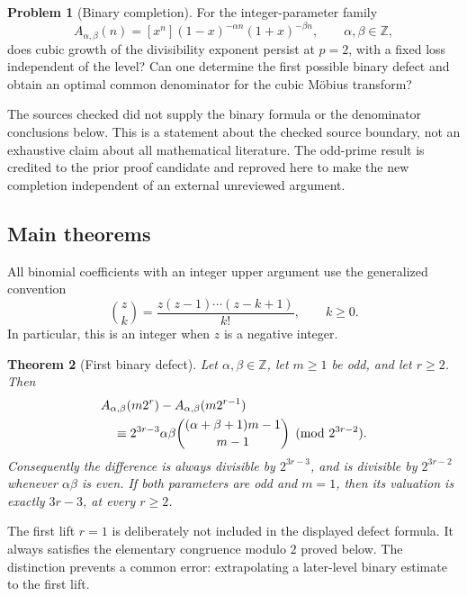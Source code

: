 \documentclass[11pt,a4paper]{article}
\numberwithin{equation}{section}
\newtheorem{theorem}{Theorem}[section]
\theoremstyle{definition}
\newtheorem{problem}[theorem]{Problem}
\theoremstyle{remark}
\newcommand{\Z}{\mathbb Z}
\newcommand{\A}{A_{\alpha,\beta}}
\begin{document}
\begin{problem}[Binary completion]\label{prob:binary}
For the integer-parameter family
\begin{equation}\label{eq:family}
 \A(n)=[x^n](1-x)^{-\alpha n}(1+x)^{-\beta n},
 \qquad \alpha,\beta\in\Z,
\end{equation}
does cubic growth of the divisibility exponent persist at $p=2$, with a
fixed loss independent of the level? Can one determine the first possible
binary defect and obtain an optimal common denominator for the cubic
M\"obius transform?
\end{problem}

The sources checked did not supply the binary formula or the denominator
conclusions below. This is a statement about the checked source boundary,
not an exhaustive claim about all mathematical literature. The odd-prime
result is credited to the prior proof candidate and reproved here to make
the new completion independent of an external unreviewed argument.

\subsection{Main theorems}
All binomial coefficients with an integer upper argument use the generalized
convention
\begin{equation}\label{eq:genbinomial}
 \binom{z}{k}=\frac{z(z-1)\cdots(z-k+1)}{k!},\qquad k\ge0.
\end{equation}
In particular, this is an integer when $z$ is a negative integer.

\begin{theorem}[First binary defect]\label{thm:binary}
Let $\alpha,\beta\in\Z$, let $m\ge1$ be odd, and let $r\ge2$. Then
\begin{align}\label{eq:binary-defect}
 &\A(m2^r)-\A(m2^{r-1})\notag\\
 &\quad\equiv
 2^{3r-3}\alpha\beta
 \binom{(\alpha+\beta+1)m-1}{m-1}
 \pmod{2^{3r-2}}.
\end{align}
Consequently the difference is always divisible by $2^{3r-3}$, and is
divisible by $2^{3r-2}$ whenever $\alpha\beta$ is even. If both parameters
are odd and $m=1$, then its valuation is exactly $3r-3$, at every $r\ge2$.
\end{theorem}

The first lift $r=1$ is deliberately not included in the displayed defect
formula. It always satisfies the elementary congruence modulo $2$ proved
below. The distinction prevents a common error: extrapolating a later-level
binary estimate to the first lift.
\end{document}
